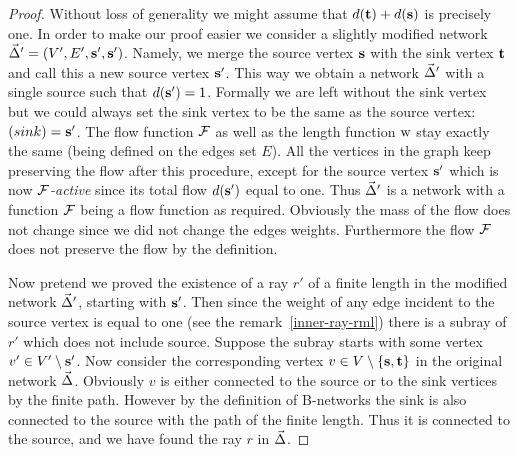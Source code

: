 \documentclass[12pt]{article}
\begin{document}
    \begin{proof}
      Without loss of generality we might assume that $d(\mathbf{t}) + d(\mathbf{s})$ is precisely one.
      In order to make our proof easier we consider a slightly modified network $\vec{\Delta}' = (V', E', \mathbf{s}', \mathbf{s}')$.
      Namely, we merge the source vertex $\mathbf{s}$ with the sink vertex $\mathbf{t}$ and call this a
        new source vertex $\mathbf{s}'$.
      This way we obtain a network $\vec{\Delta}'$ with a single source such that $d(\mathbf{s}') = 1$.
      Formally we are left without the sink vertex but we could always set the sink vertex to be the same as the source vertex: $\mathit(sink)=\mathbf{s}'$.
      The flow function $\mathcal{F}$ as well as the length function $\mathrm{w}$ stay exactly the same (being defined on the edges set $E$).
      All the vertices in the graph keep preserving the flow after this procedure, except for the source vertex $\mathbf{s}'$
        which is now \emph{$\mathcal{F}$-active} since its total flow $d(\mathbf{s}')$ equal to one.
      Thus $\vec{\Delta}'$ is a network with a function $\mathcal{F}$ being a flow function as required.
      Obviously the mass of the flow does not change since we did not change the edges weights.
      Furthermore the flow $\mathcal{F}$ does not preserve the flow by the definition.

      Now pretend we proved the existence of a ray $r'$ of a finite length in the modified network $\vec{\Delta}'$, starting with $\mathbf{s}'$.
      Then since the weight of any edge incident to the source vertex is equal to one (see the remark~\ref{inner-ray-rml})
        there is a subray of $r'$ which does not include source.
      Suppose the subray starts with some vertex $v' \in V' \setminus \mathbf{s}'$.
      Now consider the corresponding vertex $v \in V \setminus \left\{\mathbf{s}, \mathbf{t}\right\}$ in the original network $\vec{\Delta}$.
      Obviously $v$ is either connected to the source or to the sink vertices by the finite path.
      However by the definition of B-networks the sink is also connected to the source with the path of the finite length.
      Thus it is connected to the source, and we have found the ray $r$ in $\vec{\Delta}$.


\end{proof}
\end{document}
